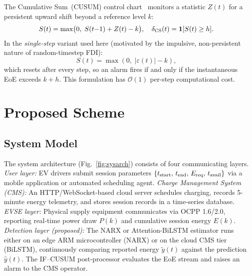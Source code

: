 \documentclass[journal]{IEEEtran}
\begin{document}
The Cumulative Sum~(CUSUM) control chart~\cite{he2020cyber}
monitors a statistic $Z(t)$ for a persistent upward shift
beyond a reference level $k$:
\begin{equation}
  S(t) = \max\bigl(0,\;S(t{-}1) + Z(t) - k\bigr),
  \quad \delta_{\rm CS}(t) = \mathbf{1}[S(t)\geq h].
  \label{eq:cusumgen}
\end{equation}
In the \emph{single-step} variant used here (motivated by the
impulsive, non-persistent nature of random-timestep FDI):
\begin{equation}
  S(t) = \max\!\left(0,\;\bigl|\varepsilon(t)\bigr| - k\right),
  \label{eq:cusum}
\end{equation}
which resets after every step, so an alarm fires if and only if
the instantaneous EoE exceeds $k + h$.
This formulation has $\mathcal{O}(1)$ per-step computational cost.

\section{Proposed Scheme}
\label{sec:scheme}

\subsection{System Model}

The system architecture (Fig.~\ref{fig:sysarch}) consists of
four communicating layers.
\textit{User layer:} EV drivers submit session parameters
$\{t_{\rm start},\,t_{\rm end},\,E_{\rm req},\,t_{\rm avail}\}$
via a mobile application or automated scheduling agent.
\textit{Charge Management System (CMS):} An HTTP/WebSocket-based
cloud server schedules charging, records 5-minute energy telemetry,
and stores session records in a time-series database.
\textit{EVSE layer:} Physical supply equipment communicates via
OCPP 1.6/2.0, reporting real-time power draw $P(k)$ and
cumulative session energy $E(k)$.
\textit{Detection layer (proposed):} The NARX or Attention-BiLSTM
estimator runs either on an edge ARM microcontroller (NARX)
or on the cloud CMS tier (BiLSTM), continuously comparing
reported energy $\tilde{y}(t)$ against the prediction $\hat{y}(t)$.
The IF--CUSUM post-processor evaluates the EoE stream and raises
an alarm to the CMS operator.
\end{document}
